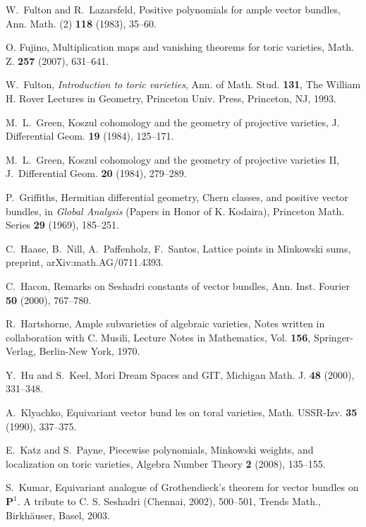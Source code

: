 \documentclass[12pt]{amsart}
\theoremstyle{definition}
\theoremstyle{remark}
\begin{document}
\begin{thebibliography}{BDPP}
W.~Fulton and R.~Lazarsfeld, Positive polynomials for ample vector bundles,  Ann. Math. (2)  \textbf{118}  (1983), 35--60.

O. Fujino, Multiplication maps and vanishing theorems for toric varieties, Math. Z. \textbf{257}
(2007), 631--641.

W.~Fulton, \emph{Introduction to toric varieties}, Ann. of Math.
Stud. \textbf{131}, The William H. Rover Lectures in Geometry,
Princeton Univ. Press, Princeton, NJ, 1993.

M.~L.~Green, Koszul cohomology and the geometry of projective
varieties, J. Differential Geom. \textbf{19} (1984), 125--171.

M.~L.~Green, Koszul cohomology and the geometry of projective
varieties II, J.~Differential Geom. \textbf{20} (1984), 279--289.

P.~Griffiths, Hermitian differential geometry, Chern classes, and positive vector bundles, in  \emph{Global Analysis} (Papers in Honor of K. Kodaira), Princeton Math. Series \textbf{29} (1969), 185--251.

C.~Haase, B.~Nill, A.~Paffenholz, F.~Santos,
 Lattice points in Minkowski sums, preprint, arXiv:math.AG/0711.4393.

 C.~Hacon, Remarks on Seshadri constants of vector bundles,
Ann. Inst. Fourier \textbf{50} (2000), 767--780.

R.~Hartshorne, Ample subvarieties of algebraic varieties, 
Notes written in collaboration with C. Musili, 
Lecture Notes in Mathematics, Vol. \textbf{156}, Springer-Verlag, Berlin-New York, 1970.

 Y.~Hu and S.~Keel, Mori Dream
Spaces and GIT, Michigan Math. J. \textbf{48} (2000), 331--348.

 A.~Klyachko, Equivariant vector bund les on toral varieties, Math. USSR-Izv. \textbf{35} (1990), 337--375.

 E.~Katz and S.~Payne, Piecewise polynomials, Minkowski weights, and localization on toric varieties,  Algebra Number Theory  \textbf{2}  (2008), 135--155.

 S.~Kumar, Equivariant analogue of Grothendieck's theorem for vector bundles on ${{\mathbf P}}^1$.
A tribute to C. S. Seshadri (Chennai, 2002),  500--501, Trends
Math., Birkh\"{a}user, Basel, 2003.


\end{thebibliography}
\end{document}

